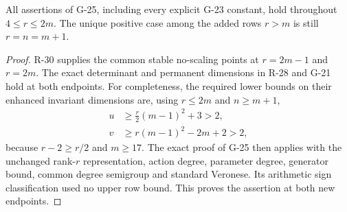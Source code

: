 \begin{corollary}\label{G25:endpoints}
All assertions of G-25, including every explicit G-23 constant,
hold throughout $4\le r\le2m$. The unique positive case among
the added rows $r>m$ is still $r=n=m+1$.
\end{corollary}

\begin{proof}
R-30 supplies the common stable no-scaling points at
$r=2m-1$ and $r=2m$. The exact determinant and permanent
dimensions in R-28 and G-21 hold at both endpoints. For
completeness, the required lower bounds on their enhanced
invariant dimensions are, using $r\le2m$ and $n\ge m+1$,
\[
 \begin{aligned}
 u&\ge\frac r2(m-1)^2+3>2,\\
 v&\ge r(m-1)^2-2m+2>2,
 \end{aligned}
\]
because $r-2\ge r/2$ and $m\ge17$.
The exact proof of G-25 then applies with the unchanged
rank-$r$ representation, action degree, parameter degree,
generator bound, common degree semigroup and standard Veronese.
Its arithmetic sign classification used no upper row bound.
This proves the assertion at both new endpoints.
\end{proof}
